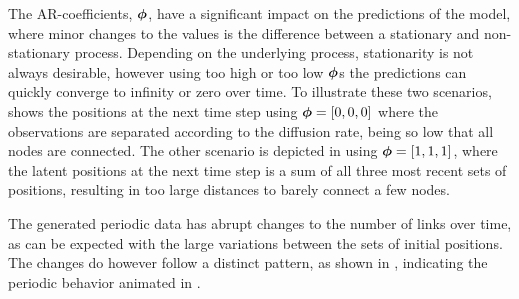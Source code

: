     The AR-coefficients, $\bm{\phi}$, have a significant impact on the predictions of the model, where minor changes to the values is the difference between a stationary and non-stationary process. Depending on the underlying process, stationarity is not always desirable, however using too high or too low $\bm{\phi}$s the predictions can quickly converge to infinity or zero over time. 
    To illustrate these two scenarios,  shows the positions at the next time step using $\bm{\phi}=[0,0,0]$ where the observations are separated according to the diffusion rate, being so low that all nodes are connected. 
    The other scenario is depicted in  using $\bm{\phi}=[1,1,1]$, where the latent positions at the next time step is a sum of all three most recent sets of positions, resulting in too large distances to barely connect a few nodes.
    
    The generated periodic data has abrupt changes to the number of links over time, as can be expected with the large variations between the sets of initial positions. The changes do however follow a distinct pattern, as shown in , indicating the periodic behavior animated in .
